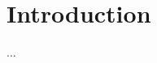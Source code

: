 \documentclass{article} %
\begin{document}
%

%
%

% 
% 
% 
\section{Introduction}
...
\end{document}
